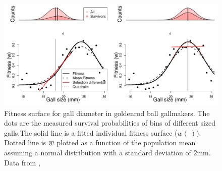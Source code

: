 \begin{figure}
\begin{center}
\includegraphics[width= \textwidth]{Journal_figs/Quant_gen/Weis_Gorman_gall_size_stablizing_sel/gall_size.pdf}
\end{center}
\caption[2cm]{Fitness surface for gall diameter in goldenrod
ball gallmakers. The dots are the measured survival probabilities of
bins of different sized galls.The solid line is a fitted individual fitness
  surface ($w(~)$). Dotted line is $\overline{w}$ plotted as a function of
  the population mean assuming a normal distribution with a standard
  deviation of $2$mm. Data from \citet{weis1990measuring}, } \label{gall_size_stab}
\end{figure}




 


 

